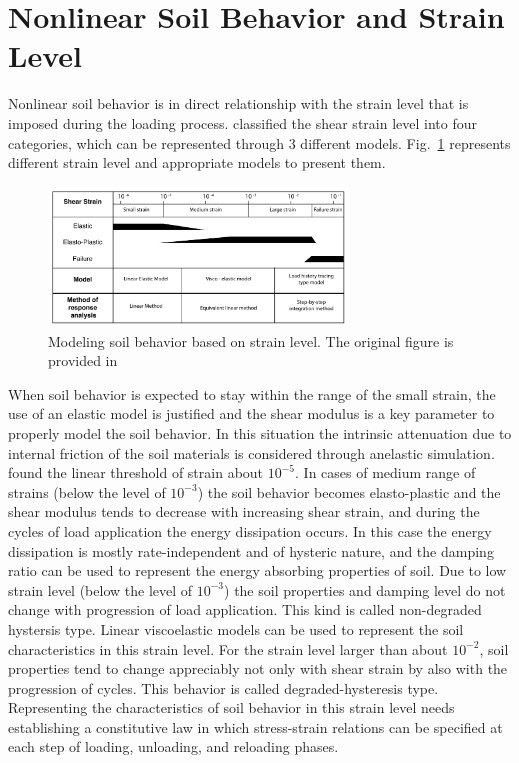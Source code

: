 
\section{Nonlinear Soil Behavior and Strain Level}

Nonlinear soil behavior is in direct relationship with the strain level that is imposed during the loading process. \citet{Ishihara_1996} classified the shear strain level into four categories, which can be represented through 3 different models. Fig.~\ref{fig:ishihara_fig_3p1} represents different strain level and appropriate models to present them.


\begin{figure}[H]
    \centering
    \includegraphics[width=300px]{figures/pdf/ishihara_fig_3p1.pdf}
    \caption{Modeling soil behavior based on strain level. The original figure is provided in  \citet{Ishihara_1996}}
    \label{fig:ishihara_fig_3p1}
\end{figure}



When soil behavior is expected to stay within the range of the small strain, the use of an elastic model is justified and the shear modulus is a key parameter to properly model the soil behavior. In this situation the intrinsic attenuation due to internal friction of the soil materials is considered through anelastic simulation. \citet{Assimaki2000} found the linear threshold of strain about $10^{-5}$. In cases of medium range of strains (below the level of $10^{-3}$) the soil behavior becomes elasto-plastic and the shear modulus tends to decrease with increasing shear strain, and during the cycles of load application the energy dissipation occurs. In this case the energy dissipation is mostly rate-independent and of hysteric nature, and the damping ratio can be used to represent the energy absorbing properties of soil. Due to low strain level (below the level of $10^{-3}$) the soil properties and damping level do not change with progression of load application. This kind is called non-degraded hystersis type. Linear viscoelastic models can be used to represent the soil characteristics in this strain level. For the strain level larger than about $10^{-2}$, soil properties tend to change appreciably not only with shear strain by also with the progression of cycles. This behavior is called degraded-hysteresis type. Representing the characteristics of soil behavior in this strain level needs establishing a constitutive law in which stress-strain relations can be specified at each step of loading, unloading, and reloading phases. 

